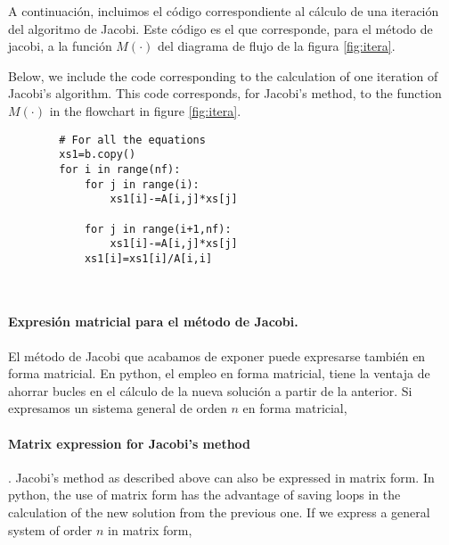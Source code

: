 \begin{paracol}{2}

A continuación, incluimos el código correspondiente al cálculo de una iteración del algoritmo de Jacobi. Este código es el que corresponde, para el método de jacobi, a la función $M(\cdot)$ del diagrama de flujo de la figura \ref{fig:itera}.

\switchcolumn

Below, we include the code corresponding to the calculation of one iteration of Jacobi's algorithm. This code corresponds, for Jacobi's method, to the function $M(\cdot)$ in the flowchart in figure \ref{fig:itera}.

\end{paracol}
\begin{verbatim}
        # For all the equations
        xs1=b.copy()
        for i in range(nf):
            for j in range(i):
                xs1[i]-=A[i,j]*xs[j]

            for j in range(i+1,nf):
                xs1[i]-=A[i,j]*xs[j]
            xs1[i]=xs1[i]/A[i,i]

        
\end{verbatim}

\begin{paracol}{2}

\paragraph{Expresión matricial para el método de Jacobi.}  El método de Jacobi que acabamos de exponer puede expresarse también en forma matricial. En python, el empleo en forma matricial, tiene la ventaja de ahorrar bucles en el cálculo de la nueva solución a partir de la anterior. Si expresamos un sistema general de orden $n$ en forma matricial,

\switchcolumn

\paragraph{Matrix expression for Jacobi's method}.  Jacobi's method as described above can also be expressed in matrix form. In python, the use of matrix form has the advantage of saving loops in the calculation of the new solution from the previous one. If we express a general system of order $n$ in matrix form,
\end{paracol}

